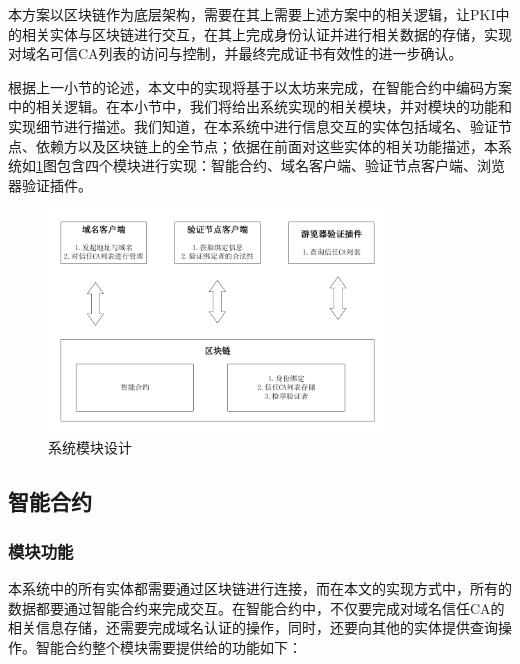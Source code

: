本方案以区块链作为底层架构，需要在其上需要上述方案中的相关逻辑，让PKI中的相关实体与区块链进行交互，在其上完成身份认证并进行相关数据的存储，实现对域名可信CA列表的访问与控制，并最终完成证书有效性的进一步确认。

根据上一小节的论述，本文中的实现将基于以太坊来完成，在智能合约中编码方案中的相关逻辑。在本小节中，我们将给出系统实现的相关模块，并对模块的功能和实现细节进行描述。我们知道，在本系统中进行信息交互的实体包括域名、验证节点、依赖方以及区块链上的全节点；依据在前面对这些实体的相关功能描述，本系统如\ref{fig:module}图包含四个模块进行实现：智能合约、域名客户端、验证节点客户端、浏览器验证插件。

\begin{figure}[!htbp]
 	\centering
 	\includegraphics[width = 0.8\textwidth]{img/module}
 	\caption{系统模块设计}\label{fig:module}
\end{figure}


\subsection{智能合约}

\subsubsection{模块功能}

本系统中的所有实体都需要通过区块链进行连接，而在本文的实现方式中，所有的数据都要通过智能合约来完成交互。在智能合约中，不仅要完成对域名信任CA的相关信息存储，还需要完成域名认证的操作，同时，还要向其他的实体提供查询操作。智能合约整个模块需要提供给的功能如下：

